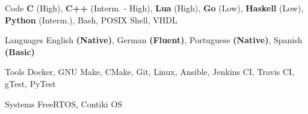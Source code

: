 
\begin{cvskills}
  \cvskill
    {Code} %
    {\textbf{C} (High),
     \textbf{C++} (Interm. - High),
     \textbf{Lua} (High),
     \textbf{Go} (Low),
     \textbf{Haskell} (Low),
     \textbf{Python} (Interm.),
     Bash, POSIX Shell,
     VHDL}

  \cvskill
    {Languages} %
    {English \textbf{(Native)}, German \textbf{(Fluent)}, Portuguese \textbf{(Native)}, Spanish \textbf{(Basic)}} %

  \cvskill
    {Tools} %
    {Docker, GNU Make, CMake, Git, Linux, Ansible, Jenkins CI, Travis CI, gTest, PyTest} %

  \cvskill
    {Systems} %
    {FreeRTOS, Contiki OS} %
\end{cvskills}

